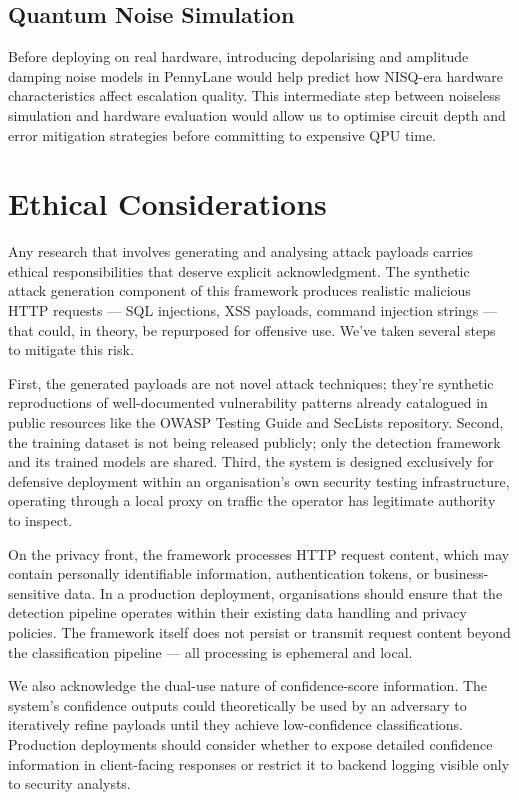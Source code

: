\documentclass[journal,onecolumn]{IEEEtran}
\begin{document}
\subsection{Quantum Noise Simulation}
Before deploying on real hardware, introducing depolarising and amplitude damping noise models in PennyLane would help predict how NISQ-era hardware characteristics affect escalation quality. This intermediate step between noiseless simulation and hardware evaluation would allow us to optimise circuit depth and error mitigation strategies before committing to expensive QPU time.

\section{Ethical Considerations}

Any research that involves generating and analysing attack payloads carries ethical responsibilities that deserve explicit acknowledgment. The synthetic attack generation component of this framework produces realistic malicious HTTP requests --- SQL injections, XSS payloads, command injection strings --- that could, in theory, be repurposed for offensive use. We've taken several steps to mitigate this risk.

First, the generated payloads are not novel attack techniques; they're synthetic reproductions of well-documented vulnerability patterns already catalogued in public resources like the OWASP Testing Guide and SecLists repository. Second, the training dataset is not being released publicly; only the detection framework and its trained models are shared. Third, the system is designed exclusively for defensive deployment within an organisation's own security testing infrastructure, operating through a local proxy on traffic the operator has legitimate authority to inspect.

On the privacy front, the framework processes HTTP request content, which may contain personally identifiable information, authentication tokens, or business-sensitive data. In a production deployment, organisations should ensure that the detection pipeline operates within their existing data handling and privacy policies. The framework itself does not persist or transmit request content beyond the classification pipeline --- all processing is ephemeral and local.

We also acknowledge the dual-use nature of confidence-score information. The system's confidence outputs could theoretically be used by an adversary to iteratively refine payloads until they achieve low-confidence classifications. Production deployments should consider whether to expose detailed confidence information in client-facing responses or restrict it to backend logging visible only to security analysts.
\end{document}
